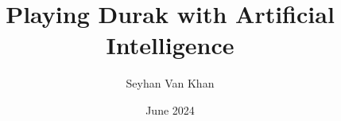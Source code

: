 \documentclass[a4paper, 12pt]{report}
\begin{document}
\title{Playing Durak with Artificial Intelligence}
\author{Seyhan Van Khan}
\date{June 2024}
\maketitle
\end{document}
